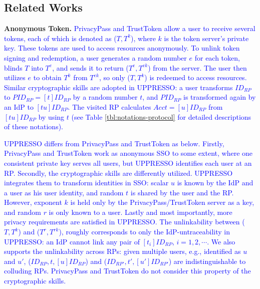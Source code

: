 \subsection{Related Works}%
\label{sec:related}

%
\noindent\textbf{Anonymous Token.}
\textcolor{blue}{PrivacyPass and TrustToken \cite{privacypass,trusttoken} allow a user to receive several tokens, each of which is denoted as ($T, T^{k}$), where $k$ is the token server's private key.
 These tokens are used to access resources anonymously.
To unlink token signing and redemption,
    a user generates a random number $e$ for each token, blinds $T$ into $T^{e}$,
        and sends it to return ($T^e, T^{ek}$) from the server.
The user then utilizes $e$ to obtain $T^k$ from $T^{ek}$, so only ($T, T^{k}$) is redeemed to access resources.
Similar cryptographic skills are adopted in UPPRESSO:
    a user transforms $ID_{RP}$ to $PID_{RP} = [t]ID_{RP}$ by a random number $t$,
 and $PID_{RP}$ is transformed again by an IdP to $[tu]ID_{RP}$.
The visited RP calculates $Acct = [u]ID_{RP}$ from $[tu]ID_{RP}$ by using $t$
 (see Table \ref{tbl:notations-protocol} for detailed descriptions of these notations).}

\textcolor{blue}{UPPRESSO differs from PrivacyPass and TrustToken as below.
Firstly,
    PrivacyPass and TrustToken work as anonymous SSO to some extent, where one consistent private key serves all users,
but UPPRESSO identifies each user at an RP.
Secondly,
   the cryptographic skills are differently utilized.
UPPRESSO integrates them to transform identities in SSO:
scalar $u$ is known by the IdP and a user as his user identity, and
random $t$ is shared by the user and the RP. However,
exponent $k$ is held only by the PrivacyPass/TrustToken server as a key,
 and random $r$ is only known to a user.
Lastly and most importantly,
more privacy requirements are satisfied in UPPRESSO.
The unlinkability between %
 ($T, T^k$) and ($T^r, T^{rk}$),
roughly corresponds to only the IdP-untraceability in UPPRESSO:
 an IdP cannot link any pair of $[t_i]ID_{RP}$,
 $i = 1, 2, \cdots$.
We also supports the unlinkability across RPs:
given multiple users, e.g., identified as $u$ and $u'$,
    ($ID_{RP}, t, [u]ID_{RP}$) and ($ID_{RP'}, t', [u']ID_{RP'}$) are indistinguishable to
    colluding RPs.
PrivacyPass and TrustToken do not consider this property of the cryptographic skills.}

